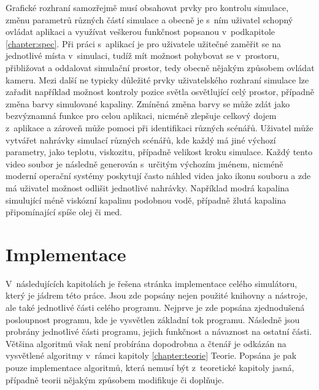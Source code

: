 Grafické rozhraní samozřejmě musí obsahovat prvky pro kontrolu simulace, změnu parametrů různých částí simulace a obecně je s~ním uživatel schopný ovládat aplikaci a využívat veškerou funkčnost popsanou v~podkapitole \ref{chapter:spec}. Při práci s~aplikací je pro uživatele užitečné zaměřit se na jednotlivé místa v~simulaci, tudíž mít možnost pohybovat se v~prostoru, přibližovat a oddalovat simulační prostor, tedy obecně nějakým způsobem ovládat kameru. Mezi další ne typicky důležité prvky uživatelského rozhraní simulace lze zařadit například možnost kontroly pozice světla osvětlující celý prostor, případně změna barvy simulované kapaliny. Zmíněná změna barvy se může zdát jako bezvýznamná funkce pro celou aplikaci, nicméně zlepšuje celkový dojem z~aplikace a zároveň může pomoci při identifikaci různých scénářů. Uživatel může vytvářet nahrávky simulací různých scénářů, kde každý má jiné výchozí parametry, jako teplotu, viskozitu, případně velikost kroku simulace. Každý tento video soubor je následně generován s~určitým výchozím jménem, nicméně moderní operační systémy poskytují často náhled videa jako ikonu souboru a zde má uživatel možnost odlišit jednotlivé nahrávky. Například modrá kapalina simulující méně viskózní kapalinu podobnou vodě, případně žlutá kapalina připomínající spíše olej či med.

\chapter{Implementace}
\label{chapter:implementace}
V~následujících kapitolách je řešena stránka implementace celého simulátoru, který je jádrem této práce. Jsou zde popsány nejen použité knihovny a nástroje, ale také jednotlivé části celého programu. Nejprve je zde popsána zjednodušená posloupnost programu, kde je vysvětlen základní tok programu. Následně jsou probrány jednotlivé části programu, jejich funkčnost a návaznost na ostatní části. Většina algoritmů však není probírána dopodrobna a čtenář je odkázán na vysvětlené algoritmy v~rámci kapitoly \ref{chapter:teorie} Teorie. Popsána je pak pouze implementace algoritmů, která nemusí být z~teoretické kapitoly jasná, případně teorii nějakým způsobem modifikuje či doplňuje.


